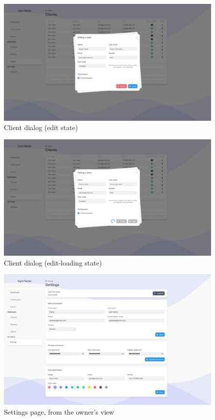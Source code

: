 \documentclass[a4paper, 12pt, oneside]{book}
\begin{document}
\begin{figure}[h!]
	\centering
	\includegraphics[width=\textwidth]{assets/ui/ClientsEdit.png}
	\caption{Client dialog (edit state)}
\end{figure}
\begin{figure}[h!]
	\centering
	\includegraphics[width=\textwidth]{assets/ui/ClientsEditLoading.png}
	\caption{Client dialog (edit-loading state)}
\end{figure}
\begin{figure}[h!]
	\centering
	\includegraphics[width=\textwidth]{assets/ui/Owner.png}
	\caption{Settings page, from the owner's view}
\end{figure}
\end{document}
